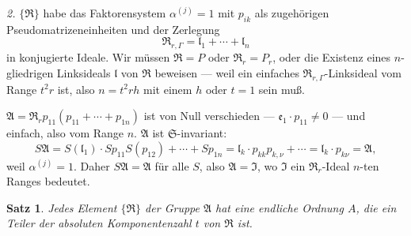 \documentclass[12pt,a4paper]{article}
\theoremstyle{plain}
\newtheorem{satz}{Satz}[section]
\theoremstyle{definition}
\theoremstyle{remark}
\begin{document}
\textit{2.} $\{\mathfrak{R}\}$ habe das Faktorensystem $\alpha^{(j)} = 1$ mit $p_{ik}$ als zugeh\"origen
Pseudomatrizeneinheiten und der Zerlegung
\[
\mathfrak{R}_{r,\varGamma} = \mathfrak{l}_{1} + \cdots + \mathfrak{l}_{n}
\]
in konjugierte Ideale. Wir m\"ussen $\mathfrak{R} = P$ oder $\mathfrak{R}_{r} = P_{r}$, oder die Existenz
eines $n$-gliedrigen Linksideals $\mathfrak{l}$ von $\mathfrak{R}$ beweisen --- weil ein einfaches
$\mathfrak{R}_{r,\varGamma}$-Linksideal vom Range $t^{2}r$ ist, also $n = t^{2}rh$ mit einem $h$ oder
$t = 1$ sein mu\ss.

$\mathfrak{A} = \mathfrak{R}_{r}p_{11}(p_{11} + \cdots + p_{1n})$ ist von Null verschieden ---
$\mathfrak{e}_{1} \cdot p_{11} \neq 0$ --- und einfach, also vom Range $n$. $\mathfrak{A}$ ist $\mathfrak{S}$-invariant:
\[
S\mathfrak{A} = S(\mathfrak{l}_{1}) \cdot Sp_{11}S(p_{12}) + \cdots + Sp_{1n}
= \mathfrak{l}_{k} \cdot p_{kk}p_{k,\nu} + \cdots = \mathfrak{l}_{k} \cdot p_{k\nu} = \mathfrak{A},
\]
weil $\alpha^{(j)} = 1$. Daher $S\mathfrak{A} = \mathfrak{A}$ f\"ur alle $S$, also $\mathfrak{A} = \mathfrak{I}$, wo $\mathfrak{I}$
ein $\mathfrak{R}_{r}$-Ideal $n$-ten Ranges bedeutet.

\begin{satz}\label{satz:24-3}
Jedes Element $\{\mathfrak{R}\}$ der Gruppe $\mathfrak{A}$ hat eine endliche Ordnung $A$, die ein
Teiler der absoluten Komponentenzahl $t$ von $\mathfrak{R}$ ist.
\end{satz}
\end{document}
